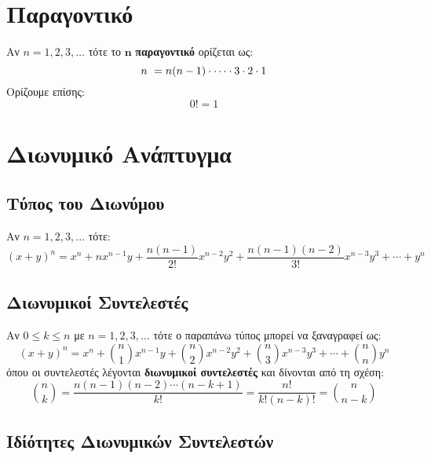 \section{Παραγοντικό}

Αν $n=1,2,3,\ldots$ τότε το $\bm{n}$ \textbf{\color{blue} παραγοντικό} ορίζεται ως:
\[
n~=n(n-1)\cdot\cdots\cdot3\cdot 2\cdot 1 \\
\]
Ορίζουμε επίσης:
\[
0!=1
\]

\section{Διωνυμικό Ανάπτυγμα}

\subsection{Τύπος του Διωνύμου}

Αν $n=1,2,3,\ldots$ τότε:
\[
(x+y)^{n}=x^{n}+nx^{n-1}y+\frac{n(n-1)}{2!}x^{n-2}y^{2}+\frac{n(n-1)(n-2)}{3!}x^{n-3}y^3+\cdots+y^{n}
\]

\subsection{Διωνυμικοί Συντελεστές}

Αν $0\leq k\leq n$ με $n=1,2,3,\ldots$ τότε ο παραπάνω τύπος μπορεί να ξαναγραφεί ως:
\[
(x+y)^{n}=x^{n}+\binom{n}{1}x^{n-1}y+\binom{n}{2}x^{n-2}y^{2}+\binom{n}{3}x^{n-3}y^{3}+\cdots+\binom{n}{n}y^{n}
\]
όπου οι συντελεστές λέγονται \textbf{\color{blue} διωνυμικοί συντελεστές} και δίνονται από τη σχέση:
\[
\binom{n}{k}=\frac{n(n-1)(n-2)\cdots(n-k+1)}{k!}=\frac{n!}{k!(n-k)!}=\binom{n}{n-k}
\]

\subsection{Ιδίότητες Διωνυμικών Συντελεστών}

